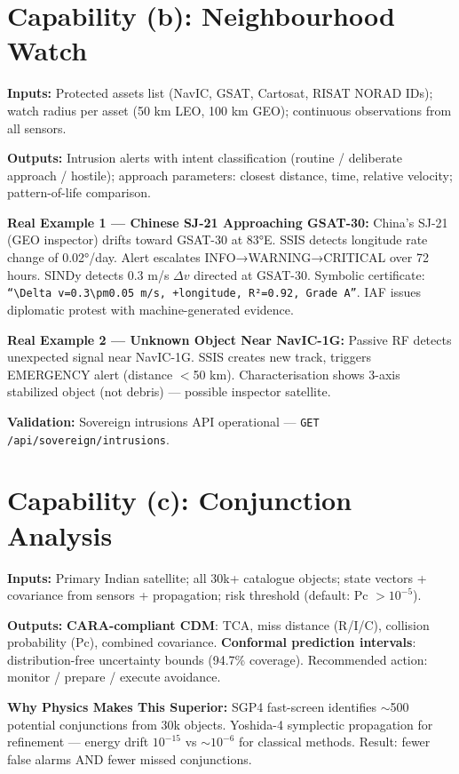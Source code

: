 \documentclass[11pt,a4paper]{article}
\begin{document}
\section{Capability (b): Neighbourhood Watch}

\textbf{Inputs:} Protected assets list (NavIC, GSAT, Cartosat, RISAT NORAD IDs); watch radius per asset (50 km LEO, 100 km GEO); continuous observations from all sensors.

\textbf{Outputs:} Intrusion alerts with intent classification (routine / deliberate approach / hostile); approach parameters: closest distance, time, relative velocity; pattern-of-life comparison.

\textbf{Real Example 1 --- Chinese SJ-21 Approaching GSAT-30:} China's SJ-21 (GEO inspector) drifts toward GSAT-30 at 83°E. SSIS detects longitude rate change of 0.02°/day. Alert escalates INFO→WARNING→CRITICAL over 72 hours. SINDy detects 0.3 m/s $\Delta v$ directed at GSAT-30. Symbolic certificate: \texttt{``$\Delta v=0.3\pm0.05$ m/s, +longitude, R²=0.92, Grade A''}. IAF issues diplomatic protest with machine-generated evidence.

\textbf{Real Example 2 --- Unknown Object Near NavIC-1G:} Passive RF detects unexpected signal near NavIC-1G. SSIS creates new track, triggers EMERGENCY alert (distance $<$50 km). Characterisation shows 3-axis stabilized object (not debris) --- possible inspector satellite.

\textbf{Validation:} Sovereign intrusions API operational --- \texttt{GET /api/sovereign/intrusions}.

\section{Capability (c): Conjunction Analysis}

\textbf{Inputs:} Primary Indian satellite; all 30k+ catalogue objects; state vectors + covariance from sensors + propagation; risk threshold (default: Pc $>10^{-5}$).

\textbf{Outputs:} \textbf{CARA-compliant CDM}: TCA, miss distance (R/I/C), collision probability (Pc), combined covariance. \textbf{Conformal prediction intervals}: distribution-free uncertainty bounds (94.7\% coverage). Recommended action: monitor / prepare / execute avoidance.

\textbf{Why Physics Makes This Superior:} SGP4 fast-screen identifies $\sim$500 potential conjunctions from 30k objects. Yoshida-4 symplectic propagation for refinement --- energy drift $10^{-15}$ vs $\sim10^{-6}$ for classical methods. Result: fewer false alarms AND fewer missed conjunctions.
\end{document}
